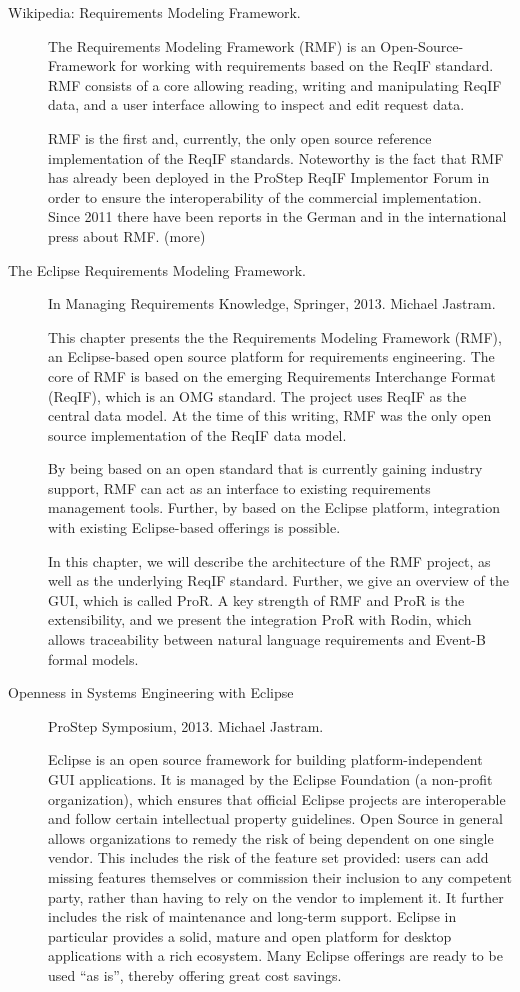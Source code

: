 \begin{description}

\item[Wikipedia: Requirements Modeling Framework.]  The Requirements Modeling Framework (RMF) is an Open-Source-Framework for working with requirements based on the ReqIF standard. RMF consists of a core allowing reading, writing and manipulating ReqIF data, and a user interface allowing to inspect and edit request data.

RMF is the first and, currently, the only open source reference implementation of the ReqIF standards. Noteworthy is the fact that RMF has already been deployed in the ProStep ReqIF Implementor Forum in order to ensure the interoperability of the commercial implementation. Since 2011 there have been reports in the German and in the international press about RMF. (more)

\item[The Eclipse Requirements Modeling Framework.] In Managing Requirements Knowledge, Springer, 2013. Michael Jastram.

 This chapter presents the the Requirements Modeling Framework (RMF), an Eclipse-based open source platform for requirements engineering. The core of RMF is based on the emerging Requirements Interchange Format (ReqIF), which is an OMG standard. The project uses ReqIF as the central data model. At the time of this writing, RMF was the only open source implementation of the ReqIF data model.

By being based on an open standard that is currently gaining industry support, RMF can act as an interface to existing requirements management tools. Further, by based on the Eclipse platform, integration with existing Eclipse-based offerings is possible.

In this chapter, we will describe the architecture of the RMF project, as well as the underlying ReqIF standard. Further, we give an overview of the GUI, which is called ProR. A key strength of RMF and ProR is the extensibility, and we present the integration ProR with Rodin, which allows traceability between natural language requirements and Event-B formal models. 

\item[Openness in Systems Engineering with Eclipse] ProStep Symposium, 2013. Michael Jastram.

Eclipse is an open source framework for building platform-independent GUI applications. It is managed by the Eclipse Foundation (a non-profit organization), which ensures that official Eclipse projects are interoperable and follow certain intellectual property guidelines. Open Source in general allows organizations to remedy the risk of being dependent on one single vendor. This includes the risk of the feature set provided: users can add missing features themselves or commission their inclusion to any competent party, rather than having to rely on the vendor to implement it. It further includes the risk of maintenance and long-term support. Eclipse in particular provides a solid, mature and open platform for desktop applications with a rich ecosystem. Many Eclipse offerings are ready to be used “as is”, thereby offering great cost savings.


\end{description}
